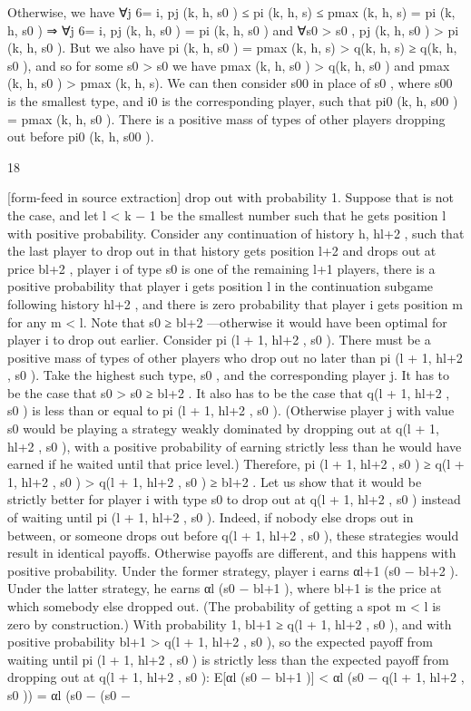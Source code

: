 \documentclass[10pt]{article}
\begin{document}
\begin{ReviewVerbatim}
Otherwise, we have ∀j 6= i, pj (k, h, s0 ) ≤ pi (k, h, s) ≤ pmax (k, h, s) = pi (k, h, s0 ) ⇒ ∀j 6= i, pj (k, h, s0 ) =
pi (k, h, s0 ) and ∀s0 > s0 , pj (k, h, s0 ) > pi (k, h, s0 ). But we also have pi (k, h, s0 ) = pmax (k, h, s) > q(k, h, s) ≥
q(k, h, s0 ), and so for some s0 > s0 we have pmax (k, h, s0 ) > q(k, h, s0 ) and pmax (k, h, s0 ) > pmax (k, h, s). We
can then consider s00 in place of s0 , where s00 is the smallest type, and i0 is the corresponding player, such that
pi0 (k, h, s00 ) = pmax (k, h, s0 ). There is a positive mass of types of other players dropping out before pi0 (k, h, s00 ).

18


[form-feed in source extraction]
drop out with probability 1. Suppose that is not the case, and let l < k − 1 be the smallest number
such that he gets position l with positive probability.
Consider any continuation of history h, hl+2 , such that the last player to drop out in that history
gets position l+2 and drops out at price bl+2 , player i of type s0 is one of the remaining l+1 players,
there is a positive probability that player i gets position l in the continuation subgame following
history hl+2 , and there is zero probability that player i gets position m for any m < l. Note
that s0 ≥ bl+2 —otherwise it would have been optimal for player i to drop out earlier. Consider
pi (l + 1, hl+2 , s0 ). There must be a positive mass of types of other players who drop out no
later than pi (l + 1, hl+2 , s0 ). Take the highest such type, s0 , and the corresponding player j.
It has to be the case that s0 > s0 ≥ bl+2 . It also has to be the case that q(l + 1, hl+2 , s0 ) is
less than or equal to pi (l + 1, hl+2 , s0 ). (Otherwise player j with value s0 would be playing a
strategy weakly dominated by dropping out at q(l + 1, hl+2 , s0 ), with a positive probability of
earning strictly less than he would have earned if he waited until that price level.) Therefore,
pi (l + 1, hl+2 , s0 ) ≥ q(l + 1, hl+2 , s0 ) > q(l + 1, hl+2 , s0 ) ≥ bl+2 . Let us show that it would be
strictly better for player i with type s0 to drop out at q(l + 1, hl+2 , s0 ) instead of waiting until
pi (l + 1, hl+2 , s0 ). Indeed, if nobody else drops out in between, or someone drops out before
q(l + 1, hl+2 , s0 ), these strategies would result in identical payoffs. Otherwise payoffs are different,
and this happens with positive probability. Under the former strategy, player i earns
αl+1 (s0 − bl+2 ).
Under the latter strategy, he earns
αl (s0 − bl+1 ),
where bl+1 is the price at which somebody else dropped out. (The probability of getting a spot
m < l is zero by construction.) With probability 1, bl+1 ≥ q(l + 1, hl+2 , s0 ), and with positive
probability bl+1 > q(l + 1, hl+2 , s0 ), so the expected payoff from waiting until pi (l + 1, hl+2 , s0 ) is
strictly less than the expected payoff from dropping out at q(l + 1, hl+2 , s0 ): E[αl (s0 − bl+1 )] <
αl (s0 − q(l + 1, hl+2 , s0 )) = αl (s0 − (s0 −


\end{ReviewVerbatim}
\end{document}
